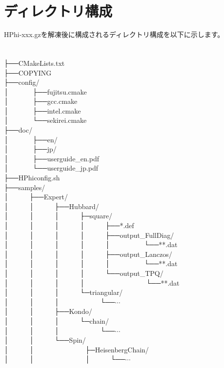 \section{ディレクトリ構成}
HPhi-xxx.gzを解凍後に構成されるディレクトリ構成を以下に示します。\\
\\
\\
├──CMakeLists.txt\\
├──COPYING\\
├──config/\\
│~~~~~~~├──fujitsu.cmake\\
│~~~~~~~├──gcc.cmake\\
│~~~~~~~├──intel.cmake\\
│~~~~~~~└──sekirei.cmake\\├──doc/\\
│~~~~~~~├──en/\\
│~~~~~~~├──jp/\\
│~~~~~~~├──userguide\_en.pdf\\
│~~~~~~~└──userguide\_jp.pdf\\
├──HPhiconfig.sh\\
├──samples/\\
│~~~~~~├──Expert/\\
│~~~~~~│~~~~~~├──Hubbard/\\
│~~~~~~│~~~~~~│~~~~~~├─square/\\
│~~~~~~│~~~~~~│~~~~~~│~~~~~~├──*.def\\
│~~~~~~│~~~~~~│~~~~~~│~~~~~~├──output\_FullDiag/\\
│~~~~~~│~~~~~~│~~~~~~│~~~~~~│~~~~~~~~~~└──**.dat\\
│~~~~~~│~~~~~~│~~~~~~│~~~~~~├──output\_Lanczos/\\
│~~~~~~│~~~~~~│~~~~~~│~~~~~~│~~~~~~~~~~└──**.dat\\
│~~~~~~│~~~~~~│~~~~~~│~~~~~~└──output\_TPQ/\\
│~~~~~~│~~~~~~│~~~~~~│~~~~~~~~~~~~~~~~~~└──**.dat\\
│~~~~~~│~~~~~~│~~~~~~└─triangular/\\
│~~~~~~│~~~~~~│~~~~~~~~~~~~└──$\cdots$\\
│~~~~~~│~~~~~~├──Kondo/\\
│~~~~~~│~~~~~~│~~~~~~└─chain/\\
│~~~~~~│~~~~~~│~~~~~~~~~~~~└──$\cdots$\\
│~~~~~~│~~~~~~└──Spin/\\
│~~~~~~│~~~~~~~~~~~~~~~├─HeisenbergChain/\\
│~~~~~~│~~~~~~~~~~~~~~~│~~~~~~└──$\cdots$\\
